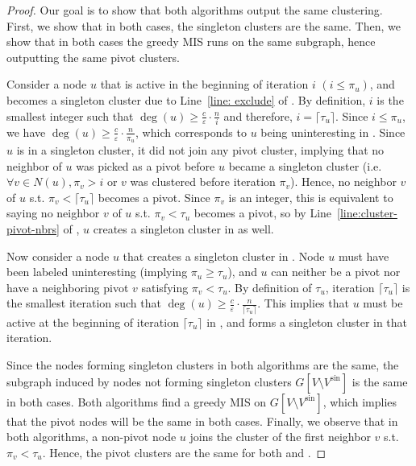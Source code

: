 \documentclass{theoretics}
\newcommand{\eps}{\ensuremath{\varepsilon}}
\newcommand{\vsin}{V^\textrm{sin}\xspace}
\begin{document}
\begin{proof}
   
    Our goal is to show that both algorithms output the same clustering. 
    First, we show that in both cases, the singleton clusters are the same.
    Then, we show that in both cases the greedy MIS runs on the same subgraph, hence outputting the same pivot clusters. 
    
    Consider a node $u$ that is active in the beginning of iteration $i$ $(i \le \pi_u)$, and becomes a singleton cluster due to Line~\ref{line: exclude} of .
    By definition, $i$ is the smallest integer such that $\deg(u) \geq \frac{c}{\eps}\cdot \frac{n}{i}$ and therefore, $i = \lceil \tau_u \rceil$. Since $i \le \pi_u$, we have $\deg(u) \geq \frac{c}{\eps}\cdot \frac{n}{\pi_u}$, which corresponds to $u$ being uninteresting in . 
    Since $u$ is in a singleton cluster, it did not join any pivot cluster, implying that no neighbor of $u$ was picked as a pivot before $u$ became a singleton cluster (i.e. $\forall v\in N(u), \pi_v>i$ or $v$ was clustered before iteration $\pi_v$). 
    Hence, no neighbor $v$ of $u$ s.t. $\pi_v<\lceil \tau_u \rceil$ becomes a pivot. Since $\pi_v$ is an integer, this is equivalent to saying no neighbor $v$ of $u$ s.t. $\pi_v<\tau_u$ becomes a pivot, so by Line~\ref{line:cluster-pivot-nbrs} of , $u$ creates a singleton cluster in  as well. 
    
    
    Now consider a node $u$ that creates a singleton cluster in . 
    Node $u$ must have been labeled uninteresting (implying $\pi_u \geq \tau_u$), and $u$ can neither be a pivot nor have a neighboring pivot $v$ satisfying $\pi_v < \tau_u$. By definition of $\tau_u$, iteration $\lceil\tau_u\rceil$ is the smallest iteration such that $\deg(u) \geq \frac{c}{\eps}\cdot \frac{n}{\lceil\tau_u\rceil}$. 
    This implies that $u$ must be active at the beginning of iteration $\lceil\tau_u\rceil$ in , and forms a singleton cluster in that iteration.
    
    Since the nodes forming singleton clusters in both algorithms are the same, the subgraph induced by nodes not forming singleton clusters $G\left[V\setminus \vsin\right]$ is the same in both cases. 
    Both algorithms find a greedy MIS on $G\left[V\setminus \vsin\right]$, which implies that the pivot nodes will be the same in both cases.
    Finally, we observe that in both algorithms, a non-pivot node $u$ joins the cluster of the first neighbor $v$ s.t. $\pi_v < \tau_u$.
    Hence, the pivot clusters are the same for both  and .
\end{proof}
\end{document}

